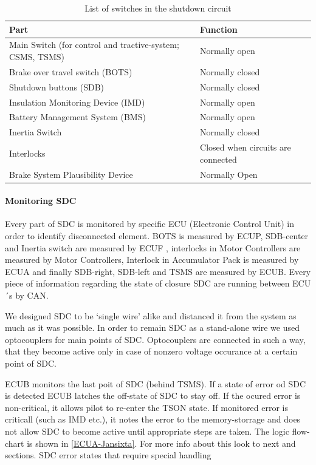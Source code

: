 \begin{table}[H]
	\caption{List of switches in the shutdown circuit}
	\centering
	\begin{tabularx}{\textwidth}{|X|l|}
		\hline Part  & Function \\[\TableSize]
		\hline Main Switch (for control and tractive-system; CSMS, TSMS) & Normally open \\[\TableSize]
		\hline Brake over travel switch (BOTS) & Normally closed \\[\TableSize]
		\hline Shutdown buttons (SDB) & Normally closed \\[\TableSize]
		\hline Insulation Monitoring Device (IMD) & Normally open \\[\TableSize]
		\hline Battery Management System (BMS) & Normally open \\[\TableSize]
		\hline Inertia Switch & Normally closed \\[\TableSize]
		\hline Interlocks & Closed when circuits are connected \\[\TableSize]
		\hline Brake System Plausibility Device & Normally Open \\[\TableSize]
		\hline
	\end{tabularx}%
	\label{tab:SDCswitch}%
\end{table}%


\paragraph{Monitoring SDC}
Every part of SDC is monitored by specific ECU (Electronic Control Unit) in order to identify disconnected element. BOTS is measured by ECUP, SDB-center  and Inertia switch are measured by ECUF , interlocks in Motor Controllers are measured by Motor Controllers, Interlock in Accumulator Pack is measured by ECUA  and finally SDB-right, SDB-left and TSMS   are measured by ECUB. Every piece of information regarding the state of closure SDC are running between ECU´s by CAN. 

We designed SDC to be ‘single wire’ alike and distanced it from the system as much as it was possible. In order to remain SDC as a stand-alone wire we used optocouplers for main points of SDC. Optocouplers are connected in such a way, that they become active only in case of nonzero voltage occurance at a certain point of SDC.

ECUB monitors the last poit of SDC (behind TSMS). If a state of error od SDC is detected ECUB latches the off-state of SDC to stay off. If the ocured error is non-critical, it allows pilot to re-enter the TSON state. If monitored error is criticall (such as IMD etc.), it notes the error to the memory-storrage and does not allow SDC to become active until appropriate steps are taken. The logic flow-chart is shown in \ref{ECUA-Jansixta}. For more info about this look to next and  sections. SDC error states that require special handling

